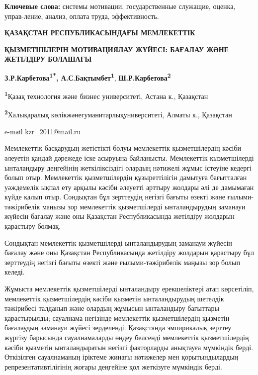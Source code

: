 {\bfseries Ключевые слова:} системы мотивации, государственные служащие,
оценка, управ-ление, анализ, оплата труда, эффективность.

\begin{center}
{\large\bfseries ҚАЗАҚСТАН РЕСПУБЛИКАСЫНДАҒЫ МЕМЛЕКЕТТІК}

{\bfseries ҚЫЗМЕТШІЛЕРІН МОТИВАЦИЯЛАУ ЖҮЙЕСІ: БАҒАЛАУ ЖӘНЕ ЖЕТІЛДІРУ
БОЛАШАҒЫ}

{\bfseries З.Р.Карбетова\textsuperscript{1*},
А.С}.{\bfseries Бақтымбет\textsuperscript{1}},
{\bfseries Ш.Р.Карбетова\textsuperscript{2}}

{\bfseries \textsuperscript{1}}Қазақ технология және бизнес университеті,
Астана к., Қазақстан

{\bfseries \textsuperscript{2}}Халықаралық
көлікжәнегуманитарлықуниверситеті, Алматы к., Қазақстан

e-mаil kzr\_2011@mail.ru
\end{center}

Мемлекеттік басқарудың жетістікті болуы мемлекеттік қызметшілердің
кәсіби әлеуетін қандай дәрежеде іске асыруына байланысты. Мемлекеттік
қызметшілерді ынталандыру деңгейінің жеткіліксіздігі олардың нәтижелі
жұмыс істеуіне кедергі болып отыр. Мемлекеттік қызметшілердің
құзыреттілігін дамытуға бағытталған уәждемелік ықпал ету арқылы кәсіби
әлеуетті арттыру жолдары әлі де дамымаған күйде қалып отыр. Сондықтан
бұл зерттеудің негізгі бағыты өзекті және ғылыми-тәжірибелік маңызы зор
мемлекеттік қызметшілерді ынталандырудың заманауи жүйесін бағалау және
оны Қазақстан Республикасында жетілдіру жолдарын қарастыру болмақ.

Сондықтан мемлекеттік қызметшілерді ынталандырудың заманауи жүйесін
бағалау және оны Қазақстан Республикасында жетілдіру жолдарын қарастыру
бұл зерттеудің негізгі бағыты өзекті және ғылыми-тәжірибелік маңызы зор
болып келеді.

Жұмыста мемлекеттік қызметшілерді ынталандыру ерекшеліктері атап
көрсетіліп, мемлекеттік қызметшілердің кәсіби қызметін ынталандырудың
шетелдік тәжірибесі талданып және олардың жұмысын ынталандыру бағыттары
қарастырылды; сауалнама негізінде мемлекеттік қызметшілердің қызметін
бағалаудың заманауи жүйесі зерделенді. Қазақстанда эмпирикалық зерттеу
жүргізу барысында сауалнамаларды өңдеу белсенді мемлекеттік
қызметшілердің кәсіби қызметін ынталандыратын негізгі факторларды
анықтауға мүмкіндік берді. Өткізілген сауалнаманың іріктеме жинағы
нәтижелер мен қорытындылардың репрезентативтілігінің жоғары деңгейіне
қол жеткізуге мүмкіндік берді.


